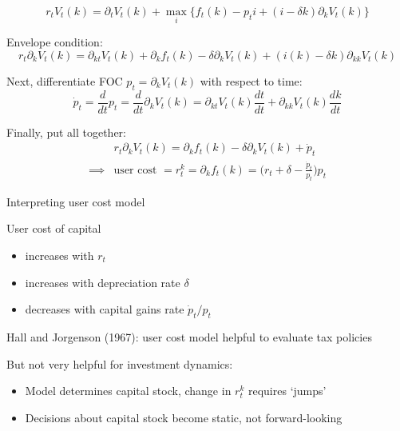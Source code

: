 \documentclass[11pt, aspectratio=169]{beamer}
\newenvironment{witemize}{\itemize\addtolength{\itemsep}{10pt}}{\enditemize}
\begin{document}
\begin{frame}{}

\begin{equation*}
	r_t V_t(k) = \partial_t V_t(k) + \max_i \bigg\{ f_t(k) - p_t i + (i - \delta k) \partial_k V_t(k) \bigg\}
\end{equation*}

\begin{witemize}
\item Envelope condition: 
\begin{equation*}
	r_t \partial_k V_t(k) = \partial_{kt} V_t(k) + \partial_k f_t(k) - \delta \partial_k V_t(k) + (i(k) - \delta k) \partial_{kk} V_t(k)
\end{equation*}

\item Next, differentiate FOC $p_t = \partial_k V_t(k)$ with respect to time: 
\begin{equation*}
	\dot p_t = \frac{d}{dt} p_t = \frac{d}{dt} \partial_k V_t(k) = \partial_{kt} V_t(k) \frac{dt}{dt} + \partial_{kk} V_t(k) \frac{dk}{dt} 
\end{equation*}

\item Finally, put all together:
\begin{align*}
	& r_t \partial_k V_t(k) = \partial_k f_t(k) - \delta \partial_k V_t(k) + \dot p_t \\
	\implies & \text{user cost } = r_t^k = \partial_k f_t(k) = \bigg( r_t + \delta - \frac{\dot p_t}{p_t} \bigg) p_t
\end{align*}
\end{witemize}
\end{frame}


\begin{frame}{Interpreting user cost model}
\begin{witemize}
\item User cost of capital
\begin{itemize}
	\item increases with $r_t$
	\item increases with depreciation rate $\delta$
	\item decreases with capital gains rate $\dot p_t / p_t$
\end{itemize}

\item Hall and Jorgenson (1967): user cost model helpful to evaluate tax policies

\item But not very helpful for investment dynamics:
\begin{itemize}
	\item Model determines capital stock, change in $r_t^k$ requires `jumps'

	\item Decisions about capital stock become static, not forward-looking
\end{itemize}

\end{witemize}
\end{frame}
\end{document}
